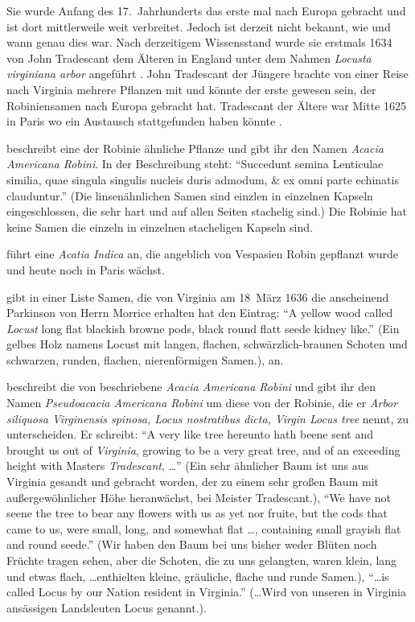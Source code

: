 \documentclass[twocolumn]{scrartcl}
\begin{document}
Sie wurde Anfang des 17.~Jahrhunderts das erste mal nach Europa gebracht und ist
dort mittlerweile weit verbreitet. Jedoch ist derzeit nicht bekannt, wie und
wann genau dies war. Nach derzeitigem Wissensstand wurde sie erstmals 1634 von
John Tradescant dem Älteren in England unter dem Nahmen \emph{Locusta virginiana
arbor} angeführt \citep[S.~339]{gunther1922botanists}. John Tradescant der
Jüngere brachte von einer Reise nach Virginia mehrere Pflanzen mit und könnte
der erste gewesen sein, der Robiniensamen nach Europa gebracht hat. Tradescant
der Ältere war Mitte 1625 in Paris wo ein Austausch stattgefunden haben
könnte \citep{ginter2022robinieGeschichte}.

\citet[S.~171--173]{cornuti1635robinie} beschreibt eine der Robinie
ähnliche Pflanze und gibt ihr den Namen \emph{Acacia Americana
Robini}. In der Beschreibung steht: \enquote{Succedunt semina Lenticulae
similia, quae singula singulis nucleis duris admodum, \& ex omni parte
echinatis clauduntur.} (Die linsenähnlichen Samen sind einzlen in
einzelnen Kapseln eingeschlossen, die sehr hart und auf allen Seiten
stachelig sind.) Die Robinie hat keine Samen die einzeln in einzelnen
stacheligen Kapseln sind.

\citet[S.~28]{deLaBrosse1636robinie} führt eine \emph{Acatia Indica}
an, die angeblich von Vespasien Robin gepflanzt wurde und heute noch
in Paris wächst.

\citet[S.~370]{gunther1922botanists} gibt in einer Liste Samen, die
von Virginia am 18~März 1636 die anscheinend Parkinson von Herrn
Morrice erhalten hat den Eintrag: \enquote{A yellow wood called
\emph{Locust} long flat blackish browne pods, black round flatt seede
kidney like.} (Ein gelbes Holz namens Locust mit langen, flachen,
schwärzlich-braunen Schoten und schwarzen, runden, flachen,
nierenförmigen Samen.), an.

\citet[S.~1550]{parkinson1640theatrumBotanicum} beschreibt die von
\citet{cornuti1635robinie} beschriebene \emph{Acacia Americana Robini}
und gibt ihr den Namen \emph{Pseudoacacia Americana Robini} um diese
von der Robinie, die er \emph{Arbor siliquosa Virginensis spinosa,
Locus nostratibus dicta, Virgin Locus tree} nennt, zu
unterscheiden. Er schreibt: \enquote{A very like tree hereunto hath beene sent and brought us out of \emph{Virginia}, growing to be a very great tree, and of an exceeding height with Masters \emph{Tradescant}, \dots}
(Ein sehr ähnlicher Baum ist uns aus Virginia gesandt und gebracht worden, der zu einem sehr großen Baum mit außergewöhnlicher Höhe heranwächst, bei Meister Tradescant.),
\enquote{We have not seene the tree to bear any flowers with us as yet nor fruite, but the cods that came to us, were small, long, and somewhat flat \dots, containing small grayish flat and round seede.}
(Wir haben den Baum bei uns bisher weder Blüten noch Früchte tragen sehen, aber die Schoten, die zu uns gelangten, waren klein, lang und etwas flach, \dots enthielten kleine, gräuliche, flache und runde Samen.),
\enquote{\dots is called Locus by our Nation resident in Virginia.}
(\dots Wird von unseren in Virginia ansässigen Landsleuten Locus genannt.).
\end{document}
